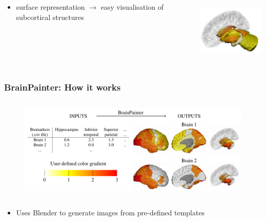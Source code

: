 \documentclass[10pt,xcolor=table,aspectratio=169]{beamer}
\begin{document}
\begin{frame}
\begin{itemize}
\begin{figure}
\end{figure}
\end{itemize}

\vspace{-1em}

\begin{columns}
 \begin{column}{0.5\textwidth}
 \begin{itemize}
   \item surface representation $\rightarrow$ easy visualisation of subcortical structures
 \end{itemize}
 \end{column}
\begin{column}{0.5\textwidth}
  \includegraphics[height=3cm]{images/DK_output/Image_1_subcortical}
\end{column}
\end{columns}
 
 
 
 
 
 
\end{frame}




\begin{frame}
 \frametitle{BrainPainter: How it works}

  
\begin{figure}
\centering
\includegraphics[height=5cm]{images/diagram.png}
\end{figure}
 
\begin{itemize}
 \item Uses Blender to generate images from pre-defined templates
\end{itemize}


 
\end{frame} 
\end{document}
